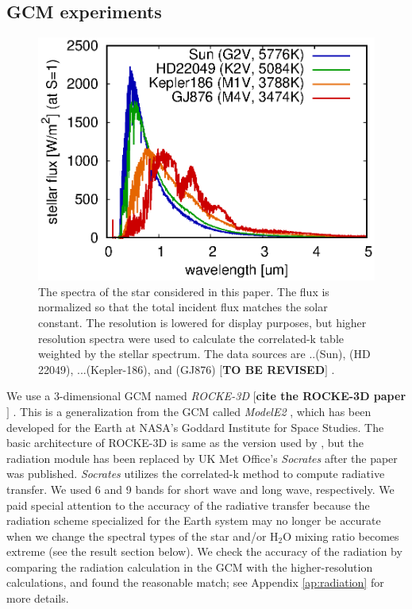 \documentclass[11pt,numberedappendix,twocolappendix,]{emulateapj}
\def\water{H$_2$O }
\def\memo#1{\color{red}$[${\bf #1}$]$ \color{black}}
\begin{document}
\subsection{GCM experiments}


\begin{figure}[!bh]
    \begin{center}
    \includegraphics[width=\hsize]{fig/star_spectra_GCM_all.eps}
    \end{center}
\caption{The spectra of the star considered in this paper. The flux is normalized so that the total incident flux matches the solar constant. The resolution is lowered for display purposes, but higher resolution spectra were used to calculate the correlated-k table weighted by the stellar spectrum. The data sources are ..(Sun), \citet{Segura2003} (HD 22049), ...(Kepler-186), and \citet{Domagal-Goldman2014} (GJ876) \memo{TO BE REVISED}. }
\label{fig:star_spectra}
\end{figure}

We use a 3-dimensional GCM named {\it ROCKE-3D} \citep{way2016,ROCKE3D} \memo{cite  the ROCKE-3D paper}. 
This is a generalization from the GCM called {\it ModelE2} \citep{Schmidt2014}, which has been developed for the Earth at NASA's Goddard Institute for Space Studies. 
The basic architecture of ROCKE-3D is same as the version used by \citet{way2016}, but the radiation module has been replaced by UK Met Office's {\it Socrates} \citep{Edwards1996} after the paper was published. 
{\it Socrates} utilizes the correlated-k method to compute radiative transfer. 
We used 6 and 9 bands for short wave and long wave, respectively. 
We paid special attention to the accuracy of the radiative transfer because the radiation scheme specialized for the Earth system may no longer be accurate when we change the spectral types of the star and/or \water mixing ratio becomes extreme (see the result section below). 
We check the accuracy of the radiation by comparing the radiation calculation in the GCM with the higher-resolution calculations, and found the reasonable match;  see Appendix \ref{ap:radiation} for more details. 
\end{document}
